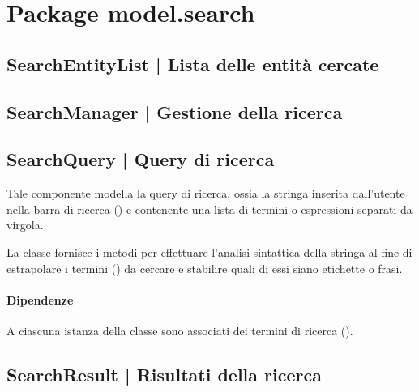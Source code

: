 \documentclass[10pt,a4paper,headinclude,footinclude,hidelinks]{scrreprt} %
\begin{document}
	\section{Package model.search}
	\label{sec:stage:design:sistema:model.search}

	\subsection[SearchEntityList]{SearchEntityList | Lista delle entità cercate}
	\label{sec:stage:design:sistema:model.search:search-entity-list}

	\subsection[SearchManager]{SearchManager | Gestione della ricerca}
	\label{sec:stage:design:sistema:model.search:search-manager}


	\subsection[SearchQuery]{SearchQuery | Query di ricerca}
	\label{sec:stage:design:sistema:model.search:search-query}
	Tale componente modella la query di ricerca, ossia la stringa inserita dall'utente nella barra di ricerca (\textit{}) e contenente una lista di termini o espressioni separati da virgola.

	La classe fornisce i metodi per effettuare l'analisi sintattica della stringa al fine di estrapolare i termini (\textit{}) da cercare e stabilire quali di essi siano etichette o frasi.

	\paragraph{Dipendenze} A ciascuna istanza della classe sono associati dei termini di ricerca (\textit{}).

	\subsection[SearchResult]{SearchResult | Risultati della ricerca}
	\label{sec:stage:design:sistema:model.search:search-result}
\end{document}
